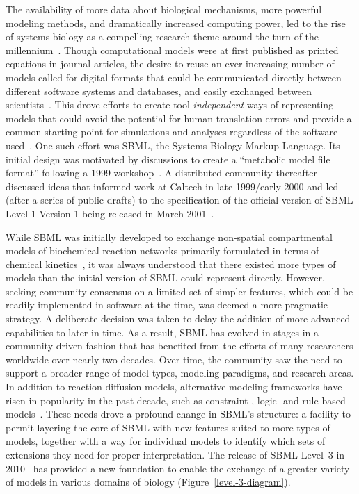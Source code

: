 \documentclass[]{draft-sbml-paper}
\begin{document}
The availability of more data about biological mechanisms, more powerful modeling methods, and dramatically increased computing power, led to the rise of systems biology as a compelling research theme around the turn of the millennium~\citep{kitano2000perspectives, ideker2001new}. Though computational models were at first published as printed equations in journal articles, the desire to reuse an ever-increasing number of models called for digital formats that could be communicated directly between different software systems and databases, and easily exchanged between scientists~\citep[topics of interest as early as the 1960's; c.f.][]{Garfinkel1969construction}. This drove efforts to create tool-\emph{independent} ways of representing models that could avoid the potential for human translation errors and provide a common starting point for simulations and analyses regardless of the software used~\citep{Lloyd2004-fd, Goddard2001-ix, hucka_2001}. One such effort was SBML, the Systems Biology Markup Language. Its initial design was motivated by discussions to create a ``metabolic model file format'' following a 1999 workshop~\citep{Cornish-Bowden2000technological}. A distributed community thereafter discussed ideas that informed work at Caltech in late 1999/early 2000 and led (after a series of public drafts) to the specification of the official version of SBML Level 1 Version 1 being released in March 2001~\citep{hucka_2003}.

While SBML was initially developed to exchange non-spatial compartmental models of biochemical reaction networks primarily formulated in terms of chemical kinetics~\citep{hucka_2002}, it was always understood that there existed more types of models than the initial version of SBML could represent directly. However, seeking community consensus on a limited set of simpler features, which could be readily implemented in software at the time, was deemed a more pragmatic strategy. A deliberate decision was taken to delay the addition of more advanced capabilities to later in time.  As a result, SBML has evolved in stages in a community-driven fashion that has benefited from the efforts of many researchers worldwide over nearly two decades.  Over time, the community saw the need to support a broader range of model types, modeling paradigms, and research areas. In addition to reaction-diffusion models, alternative modeling frameworks have risen in popularity in the past decade, such as constraint-, logic- and rule-based models~\citep{Machado2011modelinga, hubner2011applications}. These needs drove a profound change in SBML's structure: a facility to permit layering the core of SBML with new features suited to more types of models, together with a way for individual models to identify which sets of extensions they need for proper interpretation. The release of SBML Level~3 in 2010~\citep{Hucka2015} has provided a new foundation to enable the exchange of a greater variety of models in various domains of biology (Figure~\ref{level-3-diagram}).
\end{document}
